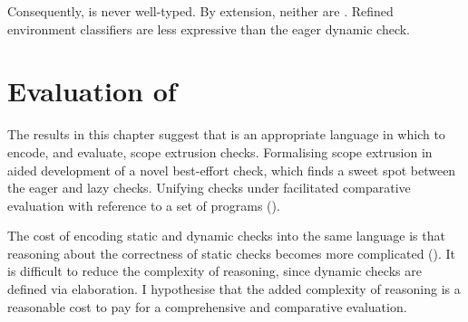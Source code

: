 Consequently,  is never well-typed. By extension, neither are . Refined environment classifiers are less expressive than the eager dynamic check. 

\section{Evaluation of \texorpdfstring{\sourceLang{}}{Lambda-Op-Quote-Splice}} \label{section:evaluation}
The results in this chapter suggest that \sourceLang{} is an appropriate language in which to encode, and evaluate, scope extrusion checks. Formalising scope extrusion in \sourceLang{} aided development of a novel best-effort check, which finds a sweet spot between the eager and lazy checks. Unifying checks under \sourceLang{} facilitated comparative evaluation with reference to a set of \sourceLang{} programs ().

The cost of encoding static and dynamic checks into the same language is that reasoning about the correctness of static checks becomes more complicated (). It is difficult to reduce the complexity of reasoning, since dynamic checks are defined via elaboration. I hypothesise that the added complexity of reasoning is a reasonable cost to pay for a comprehensive and comparative evaluation.



\newcommand{\yes}{\textbf{\textcolor{splice}{\sffamily Y}}}
\newcommand{\no}{\textbf{\textcolor{quote}{\sffamily N}}}
\newcommand{\maybe}{\textbf{\textcolor{compile}{\sffamily ?}}}


